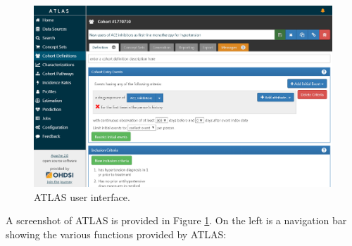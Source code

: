 \documentclass[11pt]{book}
\theoremstyle{definition}
\theoremstyle{definition}
\theoremstyle{definition}
\theoremstyle{remark}
\begin{document}
\begin{figure}

{\centering \includegraphics[width=1\linewidth]{images/OhdsiAnalyticsTools/atlas} 

}

\caption{ATLAS user interface.}\label{fig:atlas}
\end{figure}

A screenshot of ATLAS is provided in Figure \ref{fig:atlas}. On the left
is a navigation bar showing the various functions provided by ATLAS:
\end{document}

